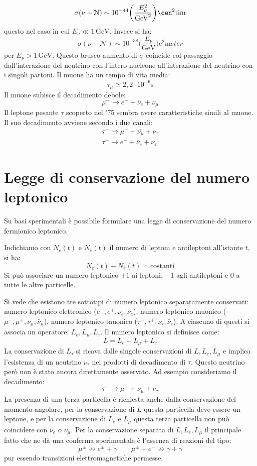 \[
\sigma(\nu-\mathcal{N})\sim 
10^{-44}\biggl(\frac{E_{\nu}^2}{\si{\giga\electronvolt}^2}\biggr)\si{\square\cen
ti\meter}
\]
questo nel caso in cui $E_{\nu}\ll 1\,\si{\giga\electronvolt}$. Invece si ha:
\[
\sigma(\nu-\mathcal{N})\sim 
10^{-38}\biggl(\frac{E_{\nu}}{\si{\giga\electronvolt}}\biggr)\si{\square\centi\m
eter}
\]
per $E_{\nu}> 1\,\si{\giga\electronvolt}$. Questo brusco aumento di $\sigma$ 
coincide col passaggio
dall'interazione del neutrino con l'intero nucleone all'interazione del 
neutrino con i singoli partoni.
Il muone ha un tempo di vita media:
\[
\tau_{\mu}\simeq 2,2\cdot 10^{-6}\si{\second}
\]
Il muone subisce il decadimento debole:
\[
\mu^-\rightarrow e^-+\bar{\nu}_e+\nu_{\mu}
\]
Il leptone pesante $\tau$ scoperto nel '75 sembra avere caratteristiche simili 
al muone. Il suo decadimento
avviene secondo i due canali:
\begin{gather}
\tau^-\rightarrow\mu^-+\bar{\nu_{\mu}}+\nu_{\tau}\\
\tau^-\rightarrow e^-+\bar{\nu}_e+\nu_{\tau}
\end{gather}

\section{Legge di conservazione del numero leptonico}
Su basi sperimentali è possibile formulare una legge di conservazione del 
numero fermionico leptonico.

Indichiamo con $N_e(t)$ e $N_{\bar{e}}(t)$ il numero di leptoni e antileptoni 
all'istante $t$, si ha:
\[
N_e(t)-N_{\bar{e}}(t)=\text{costanti}
\]
Si può associare un numero leptonico $+1$ ai leptoni, $-1$ agli antileptoni e 
$0$ a tutte le altre particelle.

Si vede che esistono tre sottotipi di numero leptonico separatamente 
conservati: numero leptonico
elettronico ($e^-,e^+,\nu_e,\bar{\nu}_e$), numero leptonico muonico 
($\mu^-,\mu^+,\nu_{\mu},\bar{\nu}_{\mu}$),
numero leptonico tauonico ($\tau^-,\tau^+,\nu_{\tau},\bar{\nu}_{\tau}$).
A ciascuno di questi si associa un operatore: $L_e,L_{\mu},L_{\tau}$. Il numero 
leptonico si definisce come:
\[
L=L_e+L_{\mu}+L_{\tau}
\]
La conservazione di $L_{\tau}$ si ricava dalle singole conservazioni di 
$L,L_e,L_{\mu}$ e implica l'esistenza di un neutrino $\nu_{\tau}$ nei prodotti 
di decadimento di $\tau$.
Questo neutrino però non è stato ancora direttamente osservato. Ad esempio 
consideriamo il decadimento:
\[
\tau^-\rightarrow\mu^-+\nu_{\mu}+\nu_{\tau}
\]
La presenza di una terza particella è richiesta anche dalla conservazione del 
momento angolare, per la
conservazione di $L$ questa particella deve essere un leptone, e per la 
conservazione di $L_e$ e $L_{\mu}$ questa
terza particella non può coincidere con $\nu_e$ o $\nu_{\mu}$.
Per la conservazione separata di $L,L_e,L_{\mu}$ il principale fatto che ne dà 
una conferma sperimentale è
l'assenza di reazioni del tipo:
\[
\mu^{\pm}\nrightarrow e^{\pm}+\gamma\qquad\mu^{\pm}+e^-\nrightarrow\gamma+\gamma
\]
pur essendo transizioni elettromagnetiche permesse.

